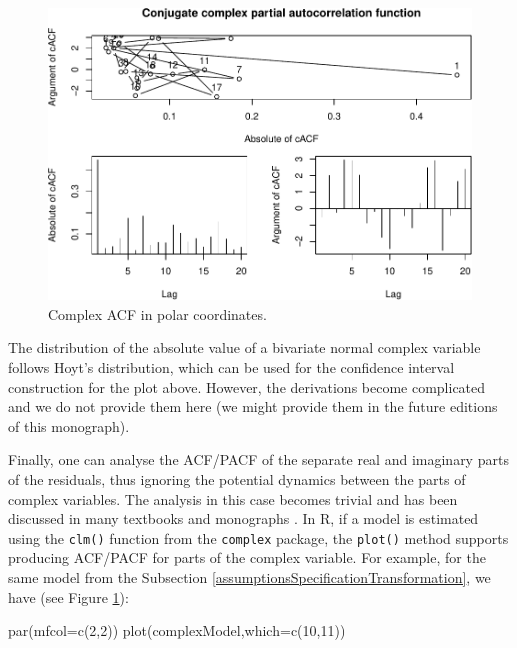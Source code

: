 \documentclass[
]{book}
\newenvironment{Shaded}{\begin{snugshade}}{\end{snugshade}}
\newcommand{\AttributeTok}[1]{\textcolor[rgb]{0.77,0.63,0.00}{#1}}
\newcommand{\DecValTok}[1]{\textcolor[rgb]{0.00,0.00,0.81}{#1}}
\newcommand{\FunctionTok}[1]{\textcolor[rgb]{0.00,0.00,0.00}{#1}}
\newcommand{\NormalTok}[1]{#1}
\begin{document}
\begin{figure}
\centering
\includegraphics{Svetunkov---Svetunkov---Complex-Valued-Econometrics_files/figure-latex/complexAR1Ploar-1.pdf}
\caption{\label{fig:complexAR1Ploar}Complex ACF in polar coordinates.}
\end{figure}

The distribution of the absolute value of a bivariate normal complex variable follows Hoyt's distribution, which can be used for the confidence interval construction for the plot above. However, the derivations become complicated and we do not provide them here (we might provide them in the future editions of this monograph).

Finally, one can analyse the ACF/PACF of the separate real and imaginary parts of the residuals, thus ignoring the potential dynamics between the parts of complex variables. The analysis in this case becomes trivial and has been discussed in many textbooks and monographs \citep[for example, see Section 14.5 of][]{SvetunkovAdam}. In R, if a model is estimated using the \texttt{clm()} function from the \texttt{complex} package, the \texttt{plot()} method supports producing ACF/PACF for parts of the complex variable. For example, for the same model from the Subsection \ref{assumptionsSpecificationTransformation}, we have (see Figure \ref{fig:complexAR1Ploar}):

\begin{Shaded}
\begin{Highlighting}[]
\FunctionTok{par}\NormalTok{(}\AttributeTok{mfcol=}\FunctionTok{c}\NormalTok{(}\DecValTok{2}\NormalTok{,}\DecValTok{2}\NormalTok{))}
\FunctionTok{plot}\NormalTok{(complexModel,}\AttributeTok{which=}\FunctionTok{c}\NormalTok{(}\DecValTok{10}\NormalTok{,}\DecValTok{11}\NormalTok{))}
\end{Highlighting}
\end{Shaded}
\end{document}
